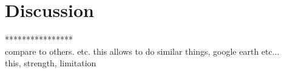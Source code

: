 \label{chapter-discussion}
\chapter{Discussion}

****************\\
compare to others. etc. this allows to do similar things, google earth etc...\\
this, strength, limitation

